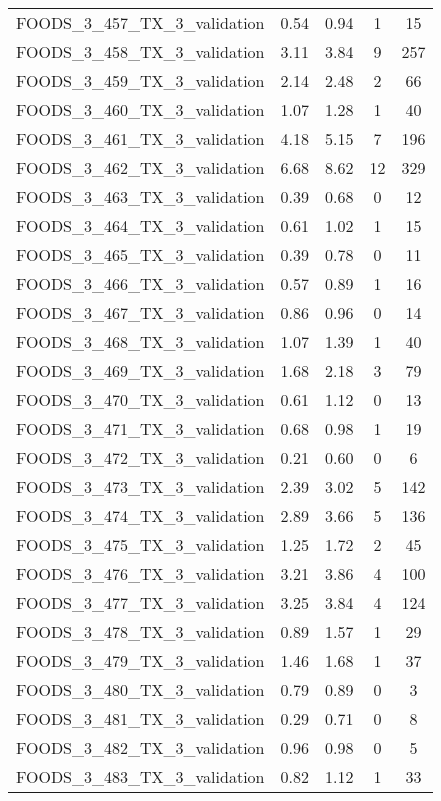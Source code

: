 \begin{table}
\begin{tabular}{|l|c|c|c|c|}
FOODS\_3\_457\_TX\_3\_validation & 0.54 & 0.94 & 1 & 15 \\
FOODS\_3\_458\_TX\_3\_validation & 3.11 & 3.84 & 9 & 257 \\
FOODS\_3\_459\_TX\_3\_validation & 2.14 & 2.48 & 2 & 66 \\
FOODS\_3\_460\_TX\_3\_validation & 1.07 & 1.28 & 1 & 40 \\
FOODS\_3\_461\_TX\_3\_validation & 4.18 & 5.15 & 7 & 196 \\
FOODS\_3\_462\_TX\_3\_validation & 6.68 & 8.62 & 12 & 329 \\
FOODS\_3\_463\_TX\_3\_validation & 0.39 & 0.68 & 0 & 12 \\
FOODS\_3\_464\_TX\_3\_validation & 0.61 & 1.02 & 1 & 15 \\
FOODS\_3\_465\_TX\_3\_validation & 0.39 & 0.78 & 0 & 11 \\
FOODS\_3\_466\_TX\_3\_validation & 0.57 & 0.89 & 1 & 16 \\
FOODS\_3\_467\_TX\_3\_validation & 0.86 & 0.96 & 0 & 14 \\
FOODS\_3\_468\_TX\_3\_validation & 1.07 & 1.39 & 1 & 40 \\
FOODS\_3\_469\_TX\_3\_validation & 1.68 & 2.18 & 3 & 79 \\
FOODS\_3\_470\_TX\_3\_validation & 0.61 & 1.12 & 0 & 13 \\
FOODS\_3\_471\_TX\_3\_validation & 0.68 & 0.98 & 1 & 19 \\
FOODS\_3\_472\_TX\_3\_validation & 0.21 & 0.60 & 0 & 6 \\
FOODS\_3\_473\_TX\_3\_validation & 2.39 & 3.02 & 5 & 142 \\
FOODS\_3\_474\_TX\_3\_validation & 2.89 & 3.66 & 5 & 136 \\
FOODS\_3\_475\_TX\_3\_validation & 1.25 & 1.72 & 2 & 45 \\
FOODS\_3\_476\_TX\_3\_validation & 3.21 & 3.86 & 4 & 100 \\
FOODS\_3\_477\_TX\_3\_validation & 3.25 & 3.84 & 4 & 124 \\
FOODS\_3\_478\_TX\_3\_validation & 0.89 & 1.57 & 1 & 29 \\
FOODS\_3\_479\_TX\_3\_validation & 1.46 & 1.68 & 1 & 37 \\
FOODS\_3\_480\_TX\_3\_validation & 0.79 & 0.89 & 0 & 3 \\
FOODS\_3\_481\_TX\_3\_validation & 0.29 & 0.71 & 0 & 8 \\
FOODS\_3\_482\_TX\_3\_validation & 0.96 & 0.98 & 0 & 5 \\
FOODS\_3\_483\_TX\_3\_validation & 0.82 & 1.12 & 1 & 33 \\

\end{tabular}
\end{table}
